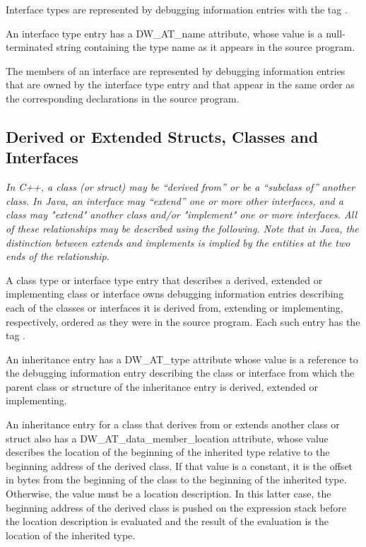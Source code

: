 Interface types are represented by debugging information
entries with the 
tag .

An interface type entry has a DW\_AT\_name attribute, whose
value is a null-terminated string containing the type name
as it appears in the source program.

The members of an interface are represented by debugging
information entries that are owned by the interface type
entry and that appear in the same order as the corresponding
declarations in the source program.

\subsection{Derived or Extended Structs, Classes and Interfaces}
\label{chap:derivedorextendedstructsclasesandinterfaces}

\textit{In C++, a class (or struct) may be ``derived from'' or be a
``subclass of'' another class. In Java, an interface may ``extend''
one or more other interfaces, and a class may "extend" another
class and/or "implement" one or more interfaces. All of these
relationships may be described using the following. Note that
in Java, the distinction between extends and implements is
implied by the entities at the two ends of the relationship.}

A class type or interface type entry that describes a
derived, extended or implementing class or interface owns
debugging information entries describing each of the classes
or interfaces it is derived from, extending or implementing,
respectively, ordered as they were in the source program. Each
such entry has the 
tag .

An inheritance entry has a DW\_AT\_type attribute whose value is
a reference to the debugging information entry describing the
class or interface from which the parent class or structure
of the inheritance entry is derived, extended or implementing.

An inheritance entry for a class that derives from or extends
another class or struct also has a DW\_AT\_data\_member\_location
attribute, whose value describes the location of the beginning
of the inherited type relative to the beginning address of the
derived class. If that value is a constant, it is the offset
in bytes from the beginning of the class to the beginning of
the inherited type. Otherwise, the value must be a location
description. In this latter case, the beginning address of
the derived class is pushed on the expression stack before
the location description is evaluated and the result of the
evaluation is the location of the inherited type.

